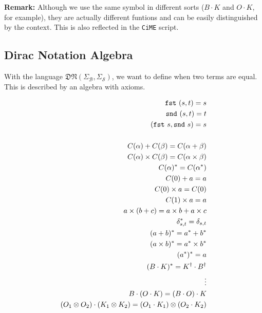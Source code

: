 \textbf{Remark: } Although we use the same symbol in different sorts ($B \cdot K$ and $O \cdot K$, for example), they are actually different funtions and can be easily distinguished by the context. This is also reflected in the \texttt{CiME} script.




\subsection{Dirac Notation Algebra}

With the language $\mathfrak{DN}(\Sigma_\mathcal{B}, \Sigma_\mathcal{S})$, we want to define when two terms are equal. This is described by an algebra with axioms.



\begin{align*}
  \texttt{fst}\ (s, t) = s \\
  \texttt{snd}\ (s, t) = t \\
  (\texttt{fst}\ s, \texttt{snd}\ s) = s \\
  \\
  C(\alpha) + C(\beta) = C(\alpha + \beta) \\
  C(\alpha) \times C(\beta) = C(\alpha \times \beta) \\
  C(\alpha)^* = C(\alpha^*) \\
  C(0) + a = a \\
  C(0) \times a = C(0) \\
  C(1) \times a = a \\
  a \times (b + c) = a \times b + a \times c \\
  \delta_{s, t}^* = \delta_{s, t} \\
  (a + b)^* = a^* + b^* \\
  (a \times b)^* = a^* \times b^* \\
  (a^*)^* = a \\
  (B \cdot K)^* = K^\dagger \cdot B^\dagger \\
  \vdots \\
  B \cdot (O \cdot K) = (B \cdot O) \cdot K \\
  (O_1 \otimes O_2) \cdot (K_1 \otimes K_2) = (O_1 \cdot K_1) \otimes (O_2 \cdot K_2)
\end{align*}

